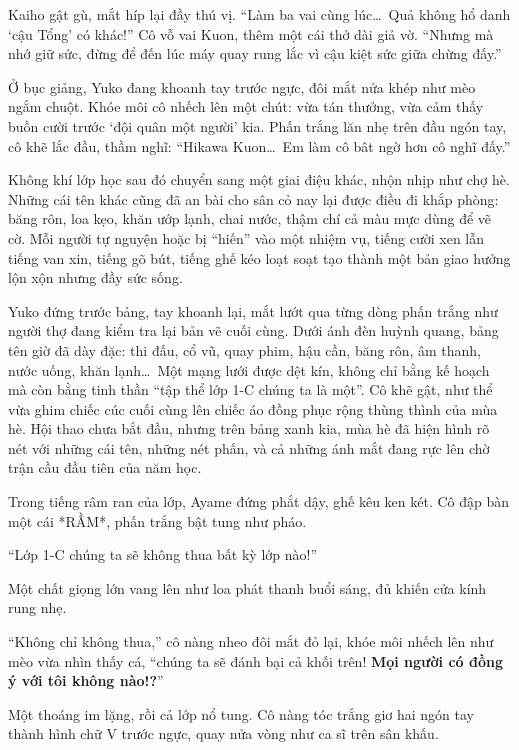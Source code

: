 \documentclass[../main.tex]{subfiles}
\begin{document}
Kaiho gật gù, mắt híp lại đầy thú vị. ``Làm ba vai cùng lúc\dots\ Quả không hổ danh `cậu Tổng' có khác!'' Cô vỗ vai Kuon, thêm một cái thở dài giả vờ. ``Nhưng mà nhớ giữ sức, đừng để đến lúc máy quay rung lắc vì cậu kiệt sức giữa chừng đấy.''

Ở bục giảng, Yuko đang khoanh tay trước ngực, đôi mắt nửa khép như mèo ngắm chuột. Khóe môi cô nhếch lên một chút: vừa tán thưởng, vừa cảm thấy buồn cười trước `đội quân một người' kia. Phấn trắng lăn nhẹ trên đầu ngón tay, cô khẽ lắc đầu, thầm nghĩ: ``Hikawa Kuon\dots\ Em làm cô bât ngờ hơn cô nghĩ đấy.''

\ct

Không khí lớp học sau đó chuyển sang một giai điệu khác, nhộn nhịp như chợ hè. Những cái tên khác cũng đã an bài cho sân cỏ nay lại được điều đi khắp phòng: băng rôn, loa kẹo, khăn ướp lạnh, chai nước, thậm chí cả màu mực dùng để vẽ cờ. Mỗi người tự nguyện hoặc bị ``hiến'' vào một nhiệm vụ, tiếng cười xen lẫn tiếng van xin, tiếng gõ bút, tiếng ghế kéo loạt soạt tạo thành một bản giao hưởng lộn xộn nhưng đầy sức sống.

Yuko đứng trước bảng, tay khoanh lại, mắt lướt qua từng dòng phấn trắng như người thợ đang kiểm tra lại bản vẽ cuối cùng. Dưới ánh đèn huỳnh quang, bảng tên giờ đã dày đặc: thi đấu, cổ vũ, quay phim, hậu cần, băng rôn, âm thanh, nước uống, khăn lạnh\dots\ Một mạng lưới được dệt kín, không chỉ bằng kế hoạch mà còn bằng tinh thần ``tập thể lớp 1-C chúng ta là một''. Cô khẽ gật, như thể vừa ghim chiếc cúc cuối cùng lên chiếc áo đồng phục rộng thùng thình của mùa hè. Hội thao chưa bắt đầu, nhưng trên bảng xanh kia, mùa hè đã hiện hình rõ nét với những cái tên, những nét phấn, và cả những ánh mắt đang rực lên chờ trận cầu đầu tiên của năm học.

Trong tiếng râm ran của lớp, Ayame đứng phắt dậy, ghế kêu ken két. Cô đập bàn một cái *RẦM*, phấn trắng bật tung như pháo.

``Lớp 1-C chúng ta sẽ không thua bất kỳ lớp nào!''

Một chất giọng lớn vang lên như loa phát thanh buổi sáng, đủ khiến cửa kính rung nhẹ.

``Không chỉ không thua,'' cô nàng nheo đôi mắt đỏ lại, khóe môi nhếch lên như mèo vừa nhìn thấy cá, ``chúng ta sẽ đánh bại cả khối trên! \textbf{Mọi người có đồng ý với tôi không nào!?}''

Một thoáng im lặng, rồi cả lớp nổ tung. Cô nàng tóc trắng giơ hai ngón tay thành hình chữ V trước ngực, quay nửa vòng như ca sĩ trên sân khấu.
\end{document}
